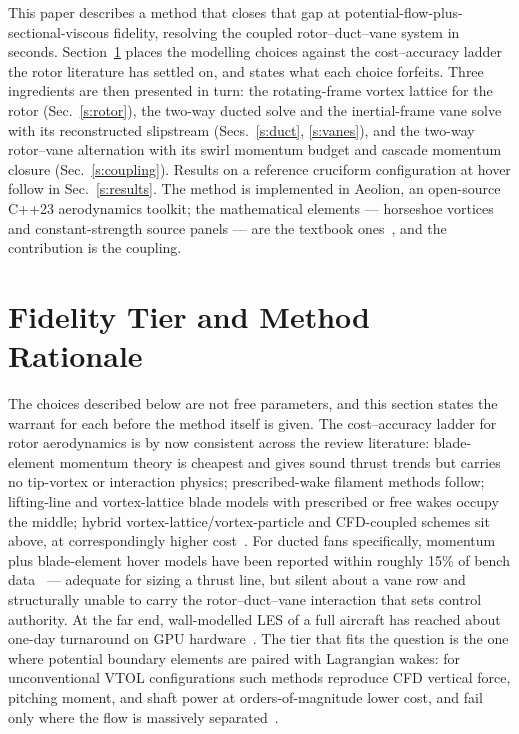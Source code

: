 \documentclass[]{aiaa-tc}%
\begin{document}
This paper describes a method that closes that gap at
potential-flow-plus-sectional-viscous fidelity, resolving the coupled
rotor--duct--vane system in seconds. Section~\ref{s:rationale} places
the modelling choices against the cost--accuracy ladder the rotor
literature has settled on, and states what each choice forfeits.
Three ingredients are then presented
in turn: the rotating-frame vortex lattice for the rotor
(Sec.~\ref{s:rotor}), the two-way ducted solve and the inertial-frame
vane solve with its reconstructed slipstream (Secs.~\ref{s:duct},
\ref{s:vanes}), and the two-way rotor--vane alternation with its swirl
momentum budget and cascade momentum closure (Sec.~\ref{s:coupling}). Results on a reference
cruciform configuration at hover follow in Sec.~\ref{s:results}. The
method is implemented in Aeolion, an open-source C++23 aerodynamics
toolkit; the mathematical elements --- horseshoe vortices and
constant-strength source panels --- are the textbook
ones~\cite{katzPlotkin2001}, and the contribution is the coupling.

\section{Fidelity Tier and Method Rationale}
\label{s:rationale}

The choices described below are not free parameters, and this section
states the warrant for each before the method itself is given. The
cost--accuracy ladder for rotor aerodynamics is by now consistent
across the review literature: blade-element momentum theory is
cheapest and gives sound thrust trends but carries no tip-vortex or
interaction physics; prescribed-wake filament methods follow;
lifting-line and vortex-lattice blade models with prescribed or free
wakes occupy the middle; hybrid vortex-lattice/vortex-particle and
CFD-coupled schemes sit above, at correspondingly higher
cost~\cite{lee2022,murua2012}. For ducted fans specifically, momentum
plus blade-element hover models have been reported within roughly
15\% of bench data~\cite{ai2021} --- adequate for sizing a thrust
line, but silent about a vane row and structurally unable to carry
the rotor--duct--vane interaction that sets control authority. At the
far end, wall-modelled LES of a full aircraft has reached about
one-day turnaround on GPU hardware~\cite{goc2021}. The tier that fits
the question is the one where potential boundary elements are paired
with Lagrangian wakes: for unconventional VTOL configurations such
methods reproduce CFD vertical force, pitching moment, and shaft
power at orders-of-magnitude lower cost, and fail only where the flow
is massively separated~\cite{tugnoli2021}.
\end{document}

